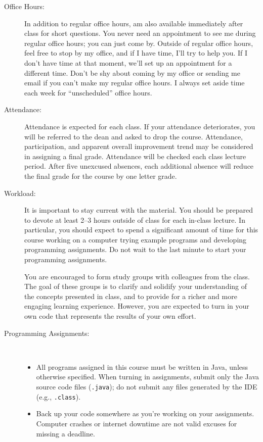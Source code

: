 \documentclass [letterpaper,11pt]{article}
\begin{document}
\begin{description}
\item[Office Hours:]
In addition to regular office hours, am also available immediately after class for 
short questions.  You never need an appointment to see me during regular office hours; you
can just come by.  Outside of regular office hours, feel free to stop by my office,
and if I have time, I'll try to help you.  If I don't have time at that moment, we'll set up an
appointment for a different time.
Don't be shy about coming by my office or sending me email
if you can't make my regular office hours.  I always set aside time each week for ``unscheduled'' office hours.


\item[Attendance:]
Attendance is expected for each class. If your attendance deteriorates, you will be referred to the dean and asked to drop the course. Attendance, participation, and apparent overall improvement trend may be considered in assigning a final grade.
Attendance will be checked each class lecture period.  After five unexcused absences, each additional absence will reduce the final grade for the course by one letter grade.

\item[Workload:]
It is important to stay current with the material.  You should be prepared to devote  at least 2--3 hours outside of class for each in-class lecture.  In particular, you should expect to spend a significant amount of time for this course working on a computer trying example programs and developing programming assignments. Do not wait to the last minute to start your programming assignments.

You are encouraged to form study groups with colleagues from the class. The goal of these groups is to clarify and solidify your understanding of the concepts presented in class, and to provide for a richer and more engaging learning experience. However, you are expected to turn in your own code that represents the results of your own effort.

\item[Programming Assignments:]\

\begin{itemize}\setlength{\itemsep}{0em}\setlength{\parskip}{0pt}
	\item All programs assigned in this course must be written in Java, unless otherwise specified.  When turning in assignments,
	submit only the Java source code files (\texttt{.java}); do not submit any files generated by the IDE (e.g., \texttt{.class}).	
			\item Back up your code somewhere as you're working on your assignments.  Computer
		crashes or internet downtime are not valid excuses for missing a deadline.
				


\end{itemize}
\end{description}
\end{document}
